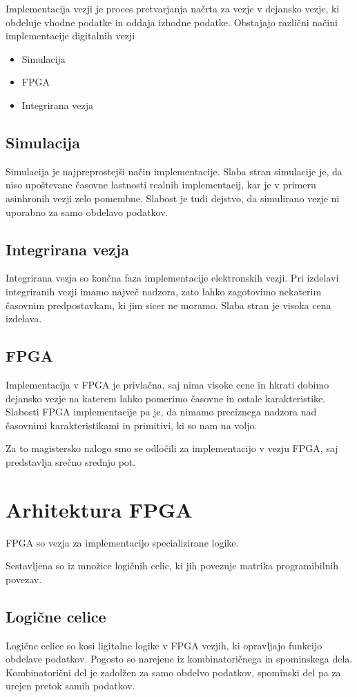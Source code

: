 Implementacija vezji je proces pretvarjanja načrta za vezje v dejansko vezje, ki obdeluje vhodne podatke in oddaja izhodne podatke. Obstajajo različni načini implementacije digitalnih vezji

\begin{itemize}
	\item Simulacija
	\item FPGA
	\item Integrirana vezja
\end{itemize}

\subsection{Simulacija}
Simulacija je najpreprostejši način implementacije. Slaba stran simulacije je, da niso upoštevane časovne lastnosti realnih implementacij, kar je v primeru asinhronih vezji zelo pomembne.
Slabost je tudi dejstvo, da simulirano vezje ni uporabno za samo obdelavo podatkov.

\subsection{Integrirana vezja}
Integrirana vezja so končna faza implementacije elektronskih vezji. Pri izdelavi integriranih vezji imamo največ nadzora, zato lahko zagotovimo nekaterim časovnim predpostavkam, ki jim sicer ne moramo. Slaba stran je visoka cena izdelava.

\subsection{FPGA}
Implementacija v FPGA je privlačna, saj nima visoke cene in hkrati dobimo dejansko vezje na katerem lahko pomerimo časovne in ostale karakteristike.
Slabosti FPGA implementacije pa je, da nimamo preciznega nadzora nad časovnimi karakteristikami in primitivi, ki so nam na voljo.


Za to magistersko nalogo smo se odločili za implementacijo v vezju FPGA, saj predstavlja srečno srednjo pot.

\section{Arhitektura FPGA} \label{a}
FPGA so vezja za implementacijo specializirane logike.

Sestavljena so iz množice logičnih celic, ki jih povezuje matrika programibilnih povezav.


\subsection{Logične celice}
Logične celice so kosi ligitalne logike v FPGA vezjih, ki opravljajo funkcijo obdelave podatkov. Pogosto so narejene iz kombinatoričnega in spominskega dela. Kombinatorični del je zadolžen za samo obdelvo podatkov, spominski del pa za urejen pretok samih podatkov.

